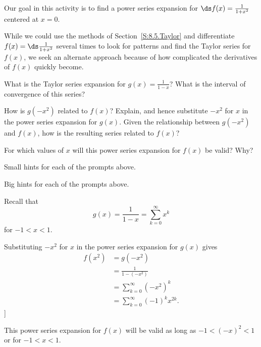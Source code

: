 \begin{activity} \label{8.6.Act2} Our goal in this activity is to find a power series expansion for $\ds f(x) = \frac{1}{1+x^2}$ centered at $x=0$. 

While we could use the methods of Section~\ref{S:8.5.Taylor} and differentiate $f(x) = \ds \frac{1}{1+x^2}$ several times to look for patterns and find the Taylor series for $f(x)$, we seek an alternate approach because of how complicated the derivatives of $f(x)$ quickly become.
\ba
\item What is the Taylor series expansion for $g(x) = \frac{1}{1-x}$? What is the interval of convergence of this series?

\item How is $g(-x^2)$ related to $f(x)$? Explain, and hence substitute $-x^2$ for $x$ in the power series expansion for $g(x)$. Given the relationship between $g(-x^2)$ and $f(x)$, how is the resulting series related to $f(x)$?

\item For which values of $x$ will this power series expansion for $f(x)$ be valid? Why?



\ea

\end{activity}

\begin{smallhint}
\ba
	\item Small hints for each of the prompts above.
\ea
\end{smallhint}
\begin{bighint}
\ba
	\item Big hints for each of the prompts above.
\ea
\end{bighint}
\begin{activitySolution}
    \ba
    \item Recall that
\[g(x) = \frac{1}{1-x} = \sum_{k=0}^{\infty} x^k\]
for $-1 < x < 1$.
    \item Substituting $-x^2$ for $x$ in the power series expansion for $g(x)$ gives
\begin{align*}
f(x^2) &= g(-x^2) \\
    &= \frac{1}{1-(-x^2)} \\
    &= \sum_{k=0}^{\infty} \left(-x^2\right)^k \\
    &= \sum_{k=0}^{\infty} (-1)^k x^{2k}.
\end{align*}]

    \item This power series expansion for $f(x)$ will be valid as long as $-1 < (-x)^2 < 1$ or for $-1 < x < 1$. 
    \ea
\end{activitySolution}
\aftera 